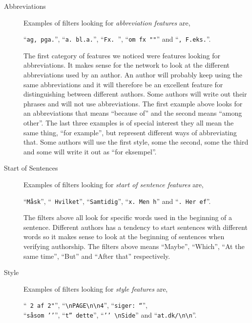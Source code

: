 \begin{description}
    \item[Abbreviations]

        Examples of filters looking for \textit{abbreviation features} are,

        ``\verb|ag, pga.|'', ``\verb|a. bl.a.|'', ``\verb|Fx. |'',
        ``\verb|om fx ""|'' and ``\verb|, F.eks.|''.

        The first category of features we noticed were features looking for
        abbreviations. It makes sense for the network to look at the different
        abbreviations used by an author. An author will probably keep using
        the same abbreviations and it will therefore be an excellent feature
        for distinguishing between different authors. Some authors will write
        out their phrases and will not use abbreviations. The first example
        above looks for an abbreviations that means ``because of'' and the
        second means ``among other''. The last three examples is of special
        interest they all mean the same thing, ``for example'', but represent
        different ways of abbreviating that. Some authors will use the first
        style, some the second, some the third and some will write it out as
        ``for eksempel''.

    \item[Start of Sentences]

        Examples of filters looking for \textit{start of sentence features} are,

        ``\verb|Måsk|'', ``\verb| Hvilket|'', ``\verb|Samtidig|'',
        ``\verb|x. Men h|'' and ``\verb|. Her ef|''.

        The filters above all look for specific words used in the beginning of
        a sentence. Different authors has a tendency to start sentences with
        different words so it makes sense to look at the beginning of sentences
        when verifying authorship. The filters above means ``Maybe'', ``Which'',
        ``At the same time'', ``But'' and ``After that'' respectively.

    \item[Style]

        Examples of filters looking for \textit{style features} are,

        ``\verb| 2 af 2"|'', ``\verb|\nPAGE\n\n4|'', ``\verb|siger: “|'',\\
        ``\verb|såsom ’’|'', ``\verb|t” dette|'', ``\verb|’’ \nSide|'' and
        ``\verb|at.dk/\n\n|''.


\end{description}
